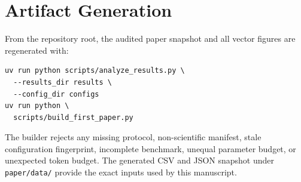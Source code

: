 \documentclass{article}
\begin{document}
\section{Artifact Generation}
From the repository root, the audited paper snapshot and all vector figures
are regenerated with:
{\scriptsize
\begin{verbatim}
uv run python scripts/analyze_results.py \
  --results_dir results \
  --config_dir configs
uv run python \
  scripts/build_first_paper.py
\end{verbatim}
}
The builder rejects any missing protocol, non-scientific manifest, stale
configuration fingerprint, incomplete benchmark, unequal parameter budget, or
unexpected token budget. The generated CSV and JSON snapshot under
\texttt{paper/data/} provide the exact inputs used by this manuscript.
\end{document}
